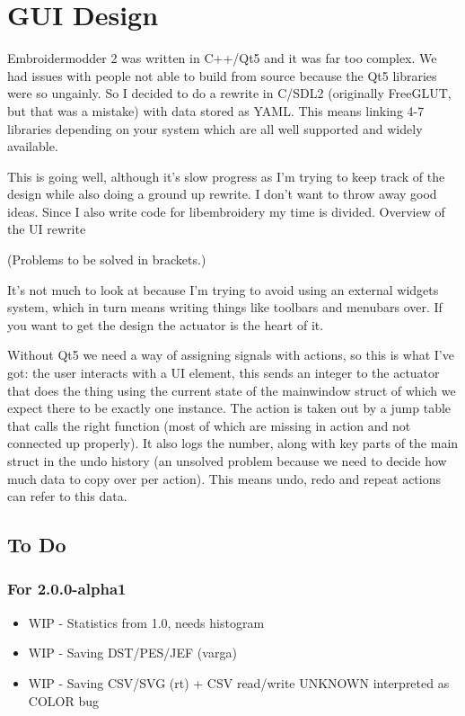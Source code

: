 \chapter{GUI Design}

Embroidermodder 2 was written in C++/Qt5 and it was far too complex. We had issues with people
not able to build from source because the Qt5 libraries were so ungainly. So I decided to do a
rewrite in C/SDL2 (originally FreeGLUT, but that was a mistake) with data stored as YAML. This
means linking 4-7 libraries depending on your system which are all well supported and widely available.

This is going well, although it's slow progress as I'm trying to keep track of the design while
also doing a ground up rewrite. I don't want to throw away good ideas. Since I also write code
for libembroidery my time is divided.
Overview of the UI rewrite

(Problems to be solved in brackets.)

It's not much to look at because I'm trying to avoid using an external widgets system, which
in turn means writing things like toolbars and menubars over. If you want to get the design
the actuator is the heart of it.

Without Qt5 we need a way of assigning signals with actions, so this is what I've got: the user interacts with a UI element, this sends an integer to the actuator that does the thing using the current state of the mainwindow struct of which we expect there to be exactly one instance. The action is taken out by a jump table that calls the right function (most of which are missing in action and not connected up properly). It also logs the number, along with key parts of the main struct in the undo history (an unsolved problem because we need to decide how much data to copy over per action). This means undo, redo and repeat actions can refer to this data.

\section{To Do}

\subsection{For 2.0.0-alpha1}

\begin{itemize}
\item WIP - Statistics from 1.0, needs histogram
\item WIP - Saving DST/PES/JEF (varga)
\item WIP - Saving CSV/SVG (rt) + CSV read/write UNKNOWN interpreted as COLOR bug
\end{itemize}

